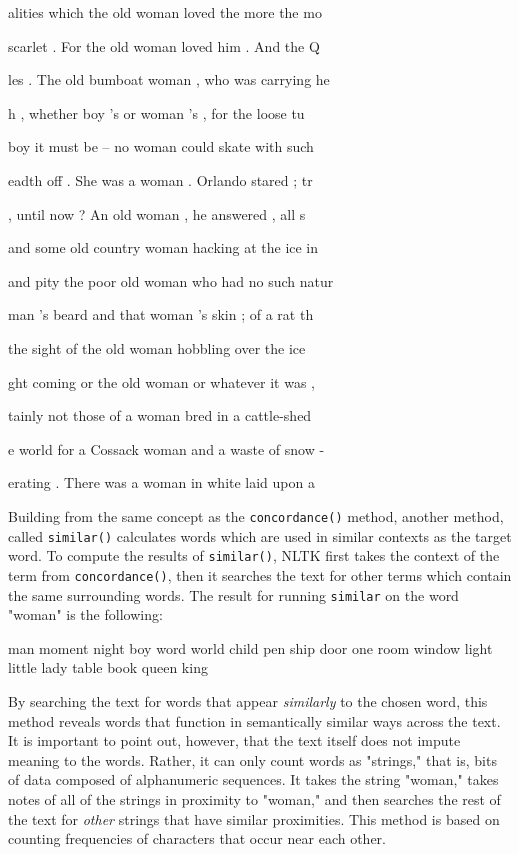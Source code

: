 \documentclass[11pt]{article}
\begin{document}
\begin{SOURCE}
alities which the old woman loved the more the mo

scarlet . For the old woman loved him . And the Q

les . The old bumboat woman , who was carrying he

h , whether boy 's or woman 's , for the loose tu

boy it must be -- no woman could skate with such

eadth off . She was a woman . Orlando stared ; tr

, until now ? An old woman , he answered , all s

and some old country woman hacking at the ice in

and pity the poor old woman who had no such natur

man 's beard and that woman 's skin ; of a rat th

the sight of the old woman hobbling over the ice

ght coming or the old woman or whatever it was , 

tainly not those of a woman bred in a cattle-shed

e world for a Cossack woman and a waste of snow -

erating . There was a woman in white laid upon a 
\end{SOURCE}

Building from the same concept as the \texttt{concordance()} method, another
method, called \texttt{similar()} calculates words which are used in similar
contexts as the target word. To compute the results of \texttt{similar()},
NLTK first takes the context of the term from \texttt{concordance()}, then it
searches the text for other terms which contain the same surrounding
words. The result for running \texttt{similar} on the word "woman" is the
following:

\begin{SOURCE}
man moment night boy word world child pen ship door one room window
light little lady table book queen king
\end{SOURCE}

By searching the text for words that appear \emph{similarly} to the chosen
word, this method reveals words that function in semantically similar
ways across the text. It is important to point out, however, that the
text itself does not impute meaning to the words. Rather, it can only
count words as "strings," that is, bits of data composed of
alphanumeric sequences. It takes the string "woman," takes notes of
all of the strings in proximity to "woman," and then searches the rest
of the text for \emph{other} strings that have similar proximities. This
method is based on counting frequencies of characters that occur near
each other.
\end{document}
